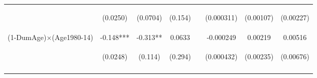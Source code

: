 \begin{subtables}
\begin{landscape}
\begin{table}[htpb!]
\begin{center}
\begin{tabular}{lcccp{0.3cm}ccc}
	& \begin{footnotesize}	(0.0250)	\end{footnotesize} & \begin{footnotesize}	(0.0704)	\end{footnotesize} & \begin{footnotesize}	(0.154)	\end{footnotesize} & \begin{footnotesize}\end{footnotesize} & \begin{footnotesize}	(0.000311)	\end{footnotesize} & \begin{footnotesize}	(0.00107)	\end{footnotesize} & \begin{footnotesize}	(0.00227)	\end{footnotesize} \\	
(1-DumAge)$\times$(Age1980-14)	&	-0.148***	&	-0.313**	&	0.0633	&&	-0.000249	&	0.00219	&	0.00516	 \\	
	& \begin{footnotesize}	(0.0248)	\end{footnotesize} & \begin{footnotesize}	(0.114)	\end{footnotesize} & \begin{footnotesize}	(0.294)	\end{footnotesize} & \begin{footnotesize}\end{footnotesize} & \begin{footnotesize}	(0.000432)	\end{footnotesize} & \begin{footnotesize}	(0.00235)	\end{footnotesize} & \begin{footnotesize}	(0.00676)	\end{footnotesize} \\	
\vspace{4pt}	&	\begin{footnotesize}\end{footnotesize}	&	\begin{footnotesize}\end{footnotesize}	&	\begin{footnotesize}\end{footnotesize}	& \begin{footnotesize}\end{footnotesize} &	\begin{footnotesize}\end{footnotesize}	&	\begin{footnotesize}\end{footnotesize}	&		\begin{footnotesize}\end{footnotesize}	 \\

\end{tabular}
\end{center}
\end{table}
\end{landscape}
\end{subtables}
